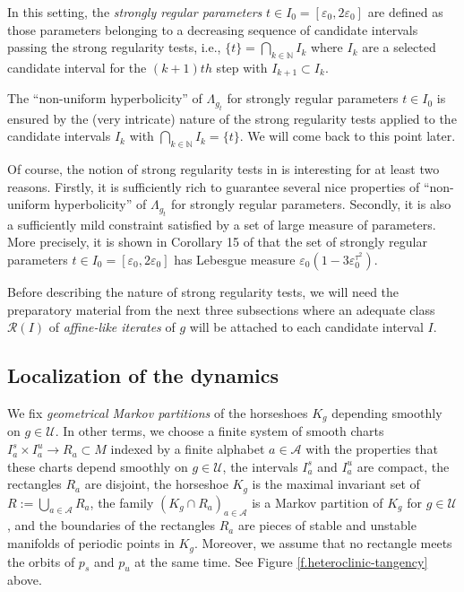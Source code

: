 \documentclass[12pt]{amsart}
\numberwithin{equation}{section}
\theoremstyle{definition}
\newcommand{\<}{{\langle}}
\renewcommand{\>}{{\rangle}}
\begin{document}
In this setting, the \emph{strongly regular parameters} $t\in I_0 = [\varepsilon_0,2\varepsilon_0]$ are defined as those parameters belonging to a decreasing sequence of candidate intervals passing the strong regularity tests, i.e., $\{t\}=\bigcap\limits_{k\in\mathbb{N}} I_k$ where $I_k$ are a selected candidate interval for the $(k+1)th$ step with $I_{k+1}\subset I_k$.

The ``non-uniform hyperbolicity'' of $\Lambda_{g_t}$ for strongly regular parameters $t\in I_0$ is ensured by the (very intricate) nature of the strong regularity tests applied to the candidate intervals $I_k$ with $\bigcap\limits_{k\in\mathbb{N}} I_k=\{t\}$. We will come back to this point later. 

Of course, the notion of strong regularity tests in \cite{PY09} is interesting for at least two reasons. Firstly, it is sufficiently rich to guarantee several nice properties of ``non-uniform hyperbolicity'' of $\Lambda_{g_t}$ for strongly regular parameters. Secondly, it is also a sufficiently mild constraint satisfied by a set of large measure of parameters. More precisely, it is shown in Corollary 15 of \cite{PY09} that the set of strongly regular parameters $t\in I_0=[\varepsilon_0, 2\varepsilon_0]$ has Lebesgue measure $\varepsilon_0(1 - 3\varepsilon_0^{\tau^2})$. 

Before describing the nature of strong regularity tests, we will need the preparatory material from the next three subsections where an adequate class $\mathcal{R}(I)$ of \emph{affine-like iterates} of $g$ will be attached to each candidate interval $I$. 

\subsection{Localization of the dynamics}\label{ss.local-dynamics}

We fix \emph{geometrical Markov partitions} of the horseshoes $K_g$ depending smoothly on $g\in\mathcal{U}$. In other terms, we choose a finite system of smooth charts $I_a^s\times I_a^u\to R_a\subset M$ indexed by a finite alphabet $a\in\mathcal{A}$ with the properties that these charts depend smoothly on $g\in\mathcal{U}$, the intervals $I_a^s$ and $I_a^u$ are compact, the rectangles $R_a$ are disjoint, the horseshoe $K_g$ is the maximal invariant set of $R:=\bigcup\limits_{a\in\mathcal{A}}R_a$, the family $(K_g\cap R_a)_{a\in\mathcal{A}}$ is a Markov partition of $K_g$ for $g\in\mathcal{U}$, and the boundaries of the rectangles $R_a$ are pieces of stable and unstable manifolds of periodic points in $K_g$. Moreover, we assume that no rectangle meets the orbits of $p_s$ and $p_u$ at the same time. See Figure \ref{f.heteroclinic-tangency} above. 
\end{document}

